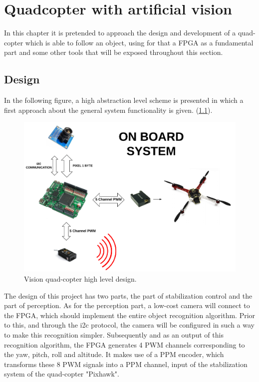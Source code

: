 \chapter{Quadcopter with artificial vision}\label{sec: Cuadricoptero}
In this chapter it is pretended to approach the design and development of a quad-copter which is able to follow an object, using for that a FPGA as a fundamental part and some other tools that will be exposed throughout this section. \newline

\section{Design}
In the following figure, a high abstraction level scheme is presented in which a first approach about the general system functionality is given. (\ref{fig:on_board}).

\begin{figure}[H]
	\center
	\includegraphics[trim = 0mm 0.5cm 0mm 0.5cm, clip,scale=0.4]{imagenes/Cuadricoptero_vision/on_board.pdf}
	\caption{Vision quad-copter high level design.}
	\label{fig:on_board}
\end{figure}

The design of this project has two parts, the part of stabilization control and the part of perception. As for the perception part, a low-cost camera will connect to the FPGA, which should implement the entire object recognition algorithm. Prior to this, and through the i2c protocol, the camera will be configured in such a way to make this recognition simpler. Subsequently and as an output of this recognition algorithm, the FPGA generates 4 PWM channels corresponding to the yaw, pitch, roll and altitude. It makes use of a PPM encoder, which transforms these 8 PWM signals into a PPM channel, input of the stabilization system of the quad-copter "Pixhawk".

